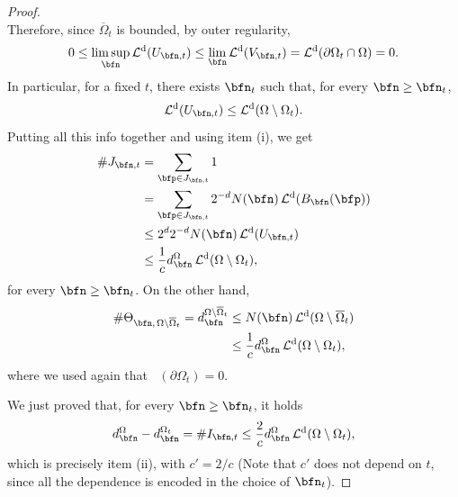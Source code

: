\documentclass{amsart}
\DeclareMathOperator{\Ld}{\mathcal{L}^d}
\begin{document}
\begin{proof}
\begin{equation*}
    \end{equation*}
    Therefore, since $\overline{\Omega}_t$ is bounded, by outer regularity,
    \begin{equation*}
    0\leq\limsup_\bfn\Ld(U_{\bfn,t})\leq\lim_\bfn\Ld(V_{\bfn,t})=\Ld(\partial\Omega_t\cap\Omega)=0.
    \end{equation*}
    In particular, for a fixed $t$, there exists $\bfn_t$ such that, for every $\bfn\geq\bfn_t$,
    \begin{equation*}
        \Ld(U_{\bfn,t})\leq\Ld(\Omega\setminus\Omega_t).
    \end{equation*}
    Putting all this info together and using item (i), we get
    \begin{align*}
        \#J_{\bfn,t}&=\sum\limits_{\bfp\in J_{\bfn,t}}1\\
            &=\sum\limits_{\bfp\in J_{\bfn,t}}2^{-d}N(\bfn)\Ld(B_\bfn(\bfp))\\
            &\leq2^d2^{-d}N(\bfn)\Ld(U_{\bfn,t})\\
            &\leq\frac1cd_\bfn^{\Omega}\Ld(\Omega\setminus\Omega_t),
    \end{align*}
    for every $\bfn\geq\bfn_t$. On the other hand,
    \begin{align*}
        \#\Theta_{\bfn,\,\Omega\setminus\overline{\Omega}_t}=d_\bfn^{\Omega\setminus\overline{\Omega}_t}&\leq N(\bfn)\Ld(\Omega\setminus\overline{\Omega}_t)\\
        &\leq\frac1c d_\bfn^{\Omega}\Ld(\Omega\setminus\Omega_t),
    \end{align*}
    where we used again that $\Ld(\partial\Omega_t)=0$. 
    
    We just proved that, for every $\bfn\geq\bfn_t$, it holds
    \begin{equation*}
        d_\bfn^{\Omega}-d_\bfn^{\Omega_t}=\#I_{\bfn,t}\leq\frac2c d_\bfn^{\Omega}\Ld(\Omega\setminus\Omega_t),
    \end{equation*}
    which is precisely item (ii), with $c'=2/c$ (Note that $c'$ does not depend on $t$, since all the dependence is encoded in the choice of $\bfn_t$). 


\end{proof}
\end{document}

